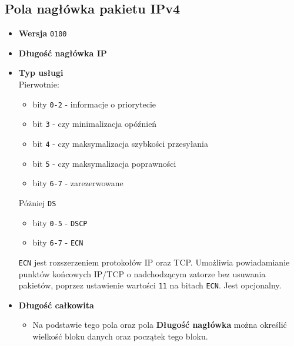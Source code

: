 \documentclass[../sk-egzamin.tex]{subfiles}
\begin{document}
\subsection*{Pola nagłówka pakietu IPv4 }
\begin{itemize}
    \item \textbf{Wersja} \texttt{0100} 
    \item \textbf{Długość nagłówka IP}
           
    \item \textbf{Typ usługi} 
          \\
          Pierwotnie:
          \begin{itemize}
              \item bity \texttt{0-2} - informacje o priorytecie
              \item bit \texttt{3} - czy minimalizacja opóźnień
              \item bit \texttt{4} - czy maksymalizacja szybkości przesyłania
              \item bit \texttt{5} - czy maksymalizacja poprawności\\
              \item bity \texttt{6-7} - zarezerwowane
          \end{itemize}
          Póżniej \texttt{DS} 
          \begin{itemize}
              \item bity \texttt{0-5} - \texttt{DSCP}
              \item bity \texttt{6-7} - \texttt{ECN}
          \end{itemize}
         \texttt{ECN} jest rozszerzeniem protokołów IP oraz TCP.
         Umożliwia powiadamianie punktów końcowych IP/TCP o nadchodzącym zatorze
         bez usuwania pakietów, poprzez ustawienie wartości \texttt{11} na
         bitach \texttt{ECN}. Jest opcjonalny.
    \item \textbf{Długość całkowita} 
    \begin{itemize}
        \item Na podstawie tego pola oraz pola \textbf{Długość nagłówka}
        można określić wielkość bloku danych oraz początek tego bloku.
    \end{itemize}
    \pagebreak

\end{itemize}
\end{document}
